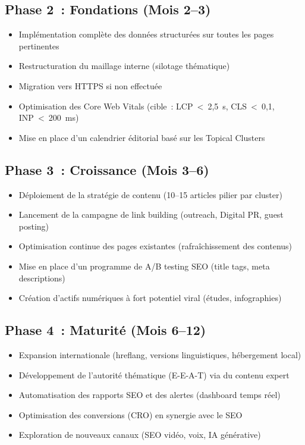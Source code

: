 \documentclass[12pt,a4paper,twoside]{report}
\begin{document}
\subsection{Phase 2~: Fondations (Mois 2--3)}

\begin{itemize}
    \item Implémentation complète des données structurées sur toutes les pages pertinentes
    \item Restructuration du maillage interne (silotage thématique)
    \item Migration vers HTTPS si non effectuée
    \item Optimisation des Core Web Vitals (cible~: LCP~<~2,5~s, CLS~<~0,1, INP~<~200~ms)
    \item Mise en place d'un calendrier éditorial basé sur les Topical Clusters
\end{itemize}

\subsection{Phase 3~: Croissance (Mois 3--6)}

\begin{itemize}
    \item Déploiement de la stratégie de contenu (10--15 articles pilier par cluster)
    \item Lancement de la campagne de link building (outreach, Digital PR, guest posting)
    \item Optimisation continue des pages existantes (rafraîchissement des contenus)
    \item Mise en place d'un programme de A/B testing SEO (title tags, meta descriptions)
    \item Création d'actifs numériques à fort potentiel viral (études, infographies)
\end{itemize}

\subsection{Phase 4~: Maturité (Mois 6--12)}

\begin{itemize}
    \item Expansion internationale (hreflang, versions linguistiques, hébergement local)
    \item Développement de l'autorité thématique (E-E-A-T) via du contenu expert
    \item Automatisation des rapports SEO et des alertes (dashboard temps réel)
    \item Optimisation des conversions (CRO) en synergie avec le SEO
    \item Exploration de nouveaux canaux (SEO vidéo, voix, IA générative)
\end{itemize}
\end{document}
